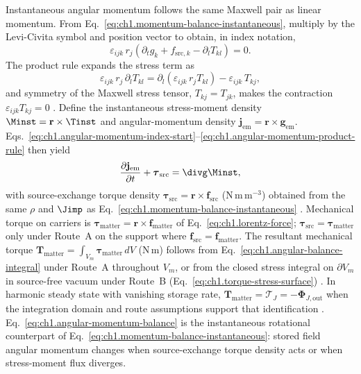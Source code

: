 Instantaneous angular momentum follows the same Maxwell pair as linear momentum. From Eq.~\eqref{eq:ch1.momentum-balance-instantaneous}, multiply by the Levi-Civita symbol and position vector to obtain, in index notation,
\begin{equation}
\label{eq:ch1.angular-momentum-index-start}
\varepsilon_{ijk}\,r_j\!\left(\partial_t g_k+f_{\mathrm{src},k}-\partial_l T_{kl}\right)
=0.
\end{equation}
The product rule expands the stress term as
\begin{equation}
\label{eq:ch1.angular-momentum-product-rule}
\varepsilon_{ijk}\,r_j\,\partial_l T_{kl}
=\partial_l\!\left(\varepsilon_{ijk}\,r_j T_{kl}\right)
-\varepsilon_{ijk}\,T_{kj},
\end{equation}
and symmetry of the Maxwell stress tensor, $T_{kj}=T_{jk}$, makes the contraction
$\varepsilon_{ijk}T_{kj}=0$ \cite{maxwell1873,stratton1941}. Define the instantaneous
stress-moment density $\Minst=\mathbf{r}\times\Tinst$ and angular-momentum density
$\mathbf{j}_{\mathrm{em}}=\mathbf{r}\times\mathbf{g}_{\mathrm{em}}$. Eqs.~\eqref{eq:ch1.angular-momentum-index-start}--\eqref{eq:ch1.angular-momentum-product-rule} then yield
\begin{equation}
\label{eq:ch1.angular-momentum-balance}
\frac{\partial\mathbf{j}_{\mathrm{em}}}{\partial t}+\boldsymbol{\tau}_{\mathrm{src}}
=\divg\Minst,
\end{equation}
with source-exchange torque density $\boldsymbol{\tau}_{\mathrm{src}}=\mathbf{r}\times\mathbf{f}_{\mathrm{src}}$ (N\,m\,m$^{-3}$) obtained from the same $\rho$ and $\Jimp$ as Eq.~\eqref{eq:ch1.momentum-balance-instantaneous} \cite{maxwell1873,stratton1941}. Mechanical torque on carriers is $\boldsymbol{\tau}_{\mathrm{matter}}=\mathbf{r}\times\mathbf{f}_{\mathrm{matter}}$ of Eq.~\eqref{eq:ch1.lorentz-force}; $\boldsymbol{\tau}_{\mathrm{src}}=\boldsymbol{\tau}_{\mathrm{matter}}$ only under Route~A on the support where $\mathbf{f}_{\mathrm{src}}=\mathbf{f}_{\mathrm{matter}}$. The resultant mechanical torque $\mathbf{T}_{\mathrm{matter}}=\int_{V_m}\boldsymbol{\tau}_{\mathrm{matter}}\,dV$ (N\,m) follows from Eq.~\eqref{eq:ch1.angular-balance-integral} under Route~A throughout $V_m$, or from the closed stress integral on $\partial V_m$ in source-free vacuum under Route~B (Eq.~\eqref{eq:ch1.torque-stress-surface}) \cite{stratton1941,beth1936}. In harmonic steady state with vanishing storage rate, $\mathbf{T}_{\mathrm{matter}}=\boldsymbol{\mathcal{T}}_J=-\boldsymbol{\Phi}_{J,\mathrm{out}}$ when the integration domain and route assumptions support that identification \cite{beth1936}. Eq.~\eqref{eq:ch1.angular-momentum-balance} is the instantaneous rotational counterpart of Eq.~\eqref{eq:ch1.momentum-balance-instantaneous}: stored field angular momentum changes when source-exchange torque density acts or when stress-moment flux diverges.

